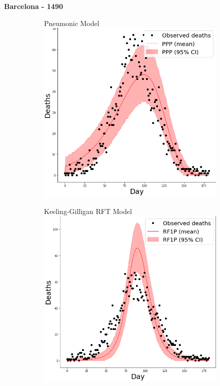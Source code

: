 \documentclass [letterpaper, 12pt] {article}
\begin{document}
\begin{center}
	\textbf{Barcelona - 1490}
\end{center}
\begin{figure}[H]
	\begin{subfigure}{0.5\textwidth}
		\centering
		Pneumonic Model
		\includegraphics[width=\linewidth]{pneum/barcelona}
	\end{subfigure}\hspace{\fill}
	\begin{subfigure}{0.5\textwidth}
		\centering
		Keeling-Gilligan RFT Model
		\includegraphics[width=\linewidth]{rats1/barcelona}

\end{subfigure}
\end{figure}
\end{document}
